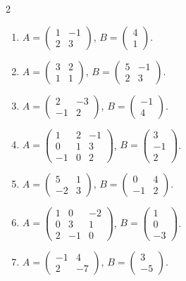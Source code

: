 \begin{multicols}{2}\raggedright
\small
\begin{enumerate}[label=\arabic*.,  leftmargin=*]
\item $A=\begin{pmatrix}1&-1\\2&3\end{pmatrix}$, $B=\begin{pmatrix}4\\1\end{pmatrix}$.
\item $A=\begin{pmatrix}3&2\\1&1\end{pmatrix}$, $B=\begin{pmatrix}5&-1\\2&3\end{pmatrix}$.
\item $A=\begin{pmatrix}2&-3\\-1&2\end{pmatrix}$, $B=\begin{pmatrix}-1\\4\end{pmatrix}$.
\item $A=\begin{pmatrix}1&2&-1\\0&1&3\\-1&0&2\end{pmatrix}$, $B=\begin{pmatrix}3\\-1\\2\end{pmatrix}$.
\item $A=\begin{pmatrix}5&1\\-2&3\end{pmatrix}$, $B=\begin{pmatrix}0&4\\-1&2\end{pmatrix}$.
\item $A=\begin{pmatrix}1&0&-2\\0&3&1\\2&-1&0\end{pmatrix}$, $B=\begin{pmatrix}1\\0\\-3\end{pmatrix}$.
\item $A=\begin{pmatrix}-1&4\\2&-7\end{pmatrix}$, $B=\begin{pmatrix}3\\-5\end{pmatrix}$.

\end{enumerate}
\end{multicols}

